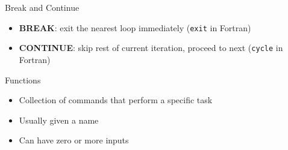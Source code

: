 \documentclass[12pt, aspectratio=169]{beamer}
\begin{document}



    \begin{frame}{Break and Continue}
        \begin{itemize}
            \item \textbf{BREAK}: exit the nearest loop immediately (\texttt{exit} in Fortran)
            \item \textbf{CONTINUE}: skip rest of current iteration, proceed to next (\texttt{cycle} in Fortran)
        \end{itemize}
    \end{frame}


    \begin{frame}{Functions}
        \begin{itemize}
            \item Collection of commands that perform a specific task
            \item Usually given a name
            \item Can have zero or more inputs
        \end{itemize}
    \end{frame}
\end{document}
